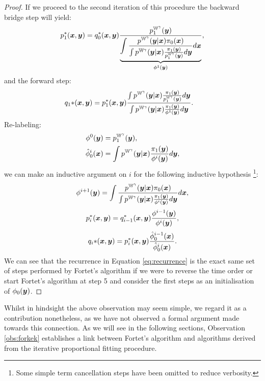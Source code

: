 \documentclass[a4paper,12pt,twoside,openright]{report}
\theoremstyle{definition}
\begin{document}
\begin{proof}
If we proceed to the second iteration of this procedure the backward bridge step will yield:
\begin{align}
    p_1^{*} ({\bm{x}}, {\bm{y}}) =  q_0^{*} ({\bm{x}}, {\bm{y}}) \frac{p^{\mathbb{W}^{\gamma}}_1({\bm{y}})}{ \underbrace{\displaystyle\int \frac{p^{\mathbb{W}^{\gamma}}({\bm{y}}| {\bm{x}})\pi_0({\bm{x}})}{\int p^{\mathbb{W}^{\gamma}}({\bm{y}}| {\bm{x}}) \frac{\pi_1({\bm{y}})}{p^{\mathbb{W}^{\gamma}}_1({\bm{y}})} d{\bm{y}}}d{\bm{x}}}_{{\phi}^{1}({\bm{y}})}} ,
\end{align}
and the forward step:
\begin{align}
    q_1{*} ({\bm{x}}, {\bm{y}}) &= p_1^{*} ({\bm{x}}, {\bm{y}}) \frac{\int    p^{\mathbb{W}^{\gamma}}({\bm{y}}| {\bm{x}}) \frac{\pi_1({\bm{y}})}{p^{\mathbb{W}^{\gamma}}_1({\bm{y}})}  d {\bm{y}}}{\int    p^{\mathbb{W}^{\gamma}}({\bm{y}}| {\bm{x}}) \frac{\pi_1({\bm{y}})}{{\phi}^{1}({\bm{y}})}  d {\bm{y}}}.
\end{align}
Re-labeling: 
\begin{align}
    \phi^0({\bm{y}})&=p^{\mathbb{W}^{\gamma}}_1({\bm{y}}), \\ 
    \hat{\phi}_0^{i}({\bm{x}}) &= \int  p^{\mathbb{W}^{\gamma}}({\bm{y}}| {\bm{x}}) \frac{\pi_1({\bm{y}})}{{\phi}^{i}({\bm{y}})}  d {\bm{y}},
\end{align}
we can make an inductive argument on $i$ for the following inductive hypothesis \footnote{Some simple term cancellation steps have been omitted to reduce verbosity.}:
\begin{align} \label{eq:recurrence}
  {\phi}^{i+1}({\bm{y}}) =  \displaystyle\int \frac{p^{\mathbb{W}^{\gamma}}({\bm{y}}| {\bm{x}})\pi_0({\bm{x}})}{\int p^{\mathbb{W}^{\gamma}}({\bm{y}}| {\bm{x}}) \frac{\pi_1({\bm{y}})}{\phi^i({\bm{y}})} d{\bm{y}}}d{\bm{x}},
 \end{align}
 \begin{align}
  p_i^{*} ({\bm{x}}, {\bm{y}}) =   q_{i-1}^{*} ({\bm{x}}, {\bm{y}}) \frac{\phi^{i-1}({\bm{y}})}{{\phi}^{i}({\bm{y}})} ,
\end{align}
 \begin{align}
      q_i{*} ({\bm{x}}, {\bm{y}}) =     p_i^{*} ({\bm{x}}, {\bm{y}}) \frac{\hat{\phi}_0^{i-1}({\bm{x}})}{\hat{\phi}_0^{i}({\bm{x}})} .
\end{align}
We can see that the  recurrence in Equation \ref{eq:recurrence} is the exact same set of steps performed by Fortet's algorithm if we were to reverse the time order or start Fortet's algorithm at step 5 and consider the first steps  as an initialisation of $\phi_0({\bm{y}})$.
\end{proof}

Whilst in hindsight the above observation may seem simple, we regard it as a contribution nonetheless, as we have not observed a formal argument made towards this connection. As we will see in the following sections, Observation \ref{obs:forkek} establishes a link between Fortet's algorithm and algorithms derived from the iterative proportional fitting procedure.
\end{document}
